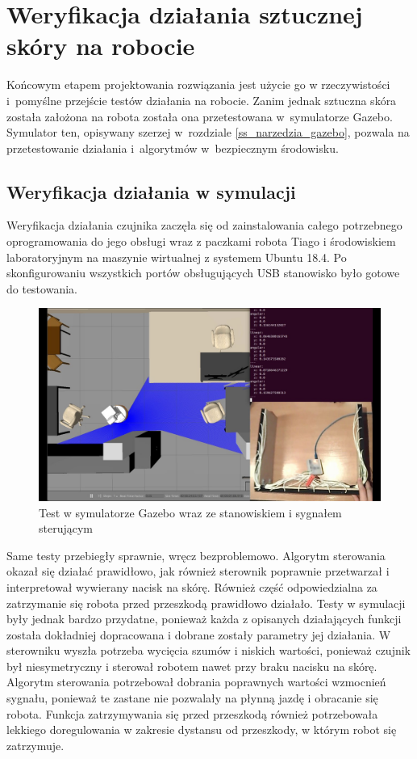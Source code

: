 \newpage
\section{Weryfikacja działania sztucznej skóry na robocie}
\label{s_testy}

Końcowym etapem projektowania rozwiązania jest użycie go w rzeczywistości i~pomyślne przejście testów działania na robocie. Zanim jednak sztuczna skóra została założona na robota została ona przetestowana w~symulatorze Gazebo. Symulator ten, opisywany szerzej w~rozdziale \ref{ss_narzedzia_gazebo}, pozwala na przetestowanie działania i~algorytmów w~bezpiecznym środowisku.

\subsection{Weryfikacja działania w symulacji}

Weryfikacja działania czujnika zaczęła się od zainstalowania całego potrzebnego oprogramowania do jego obsługi wraz z paczkami robota Tiago i środowiskiem laboratoryjnym na maszynie wirtualnej z systemem Ubuntu 18.4. Po skonfigurowaniu wszystkich portów obsługujących USB stanowisko było gotowe do testowania.

\begin{figure}[!b]
    \centering 
    \includegraphics[width=0.95\linewidth]{img/test_gazebo.jpg}
    \caption{Test w symulatorze Gazebo wraz ze stanowiskiem i sygnałem sterującym}
    \label{f_test_gazebo}
\end{figure}

Same testy przebiegły sprawnie, wręcz bezproblemowo. Algorytm sterowania okazał się działać prawidłowo, jak również sterownik poprawnie przetwarzał i interpretował wywierany nacisk na skórę. Również część odpowiedzialna za zatrzymanie się robota przed przeszkodą prawidłowo działało. Testy w symulacji były jednak bardzo przydatne, ponieważ każda z opisanych działających funkcji została dokładniej dopracowana i dobrane zostały parametry jej działania. W sterowniku wyszła potrzeba wycięcia szumów i niskich wartości, ponieważ czujnik był niesymetryczny i sterował robotem nawet przy braku nacisku na skórę. Algorytm sterowania potrzebował dobrania poprawnych wartości wzmocnień sygnału, ponieważ te zastane nie pozwalały na płynną jazdę i obracanie się robota. Funkcja zatrzymywania się przed przeszkodą również potrzebowała lekkiego doregulowania w zakresie dystansu od przeszkody, w którym robot się zatrzymuje.

